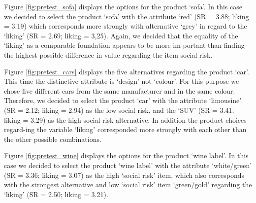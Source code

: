 Figure \ref{fig:pretest_sofa} displays the options for the product ‘sofa’. In this case we decided to select the product ‘sofa’ with the attribute ‘red’ (SR = 3.88; liking = 3.19) which corresponds more strongly with alternative ‘grey’ in regard to the ‘liking’ (SR = 2.69; liking = 3,25). Again, we decided that the equality of the ‘liking’ as a comparable foundation appears to be more im-portant than finding the highest possible difference in value regarding the item social risk. \par
Figure \ref{fig:pretest_cars} displays the five alternatives regarding the product ‘car’. This time the distinctive attribute is ‘design’ not ‘colour’. For this purpose we chose five different cars from the same manufacturer and in the same colour. Therefore, we decided to select the product ‘car’ with the attribute ‘limousine’ (SR = 2.12; liking = 2.94) as the low social risk, and the ‘SUV’ (SR =  3.41; liking = 3.29) as the high social risk alternative. In addition the product choices regard-ing the variable ‘liking’ corresponded more strongly with each other than the other possible combinations.\par
Figure \ref{fig:pretest_wine} displays the options for the product ‘wine label’. In this case we decided to select the product ‘wine label’ with the attribute ‘white/green’ (SR = 3.36; liking = 3.07) as the high ‘social risk’ item, which also corresponds with the strongest alternative and low ‘social risk’ item ‘green/gold’ regarding the ‘liking’ (SR =  2.50; liking = 3.21). \par

